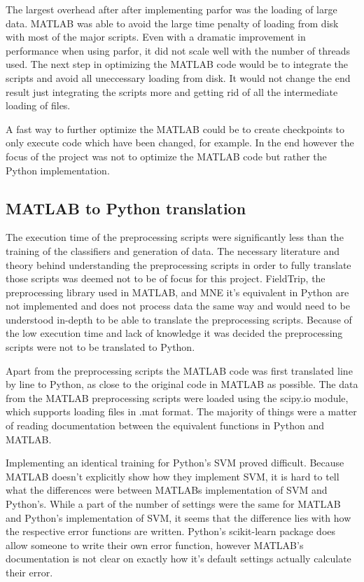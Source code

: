 \documentclass[12pt, a4paper]{article}
\begin{document}
The largest overhead after after implementing parfor was the loading of large data. 
MATLAB was able to avoid the large time penalty of loading from disk with most of the major scripts.
Even with a dramatic improvement in performance when using parfor, it did not scale well with the number of threads used.
The next step in optimizing the MATLAB code would be to integrate the scripts and avoid all uneccessary loading from disk.
It would not change the end result just integrating the scripts more and getting rid of all the intermediate loading of files.

A fast way to further optimize the MATLAB could be to create checkpoints to only execute code which have been changed, for example.
In the end however the focus of the project was not to optimize the MATLAB code but rather the Python implementation.


\subsection{MATLAB to Python translation}

The execution time of the preprocessing scripts were significantly less than the training of the classifiers and generation of data. 
The necessary literature and theory behind understanding the preprocessing scripts in order to fully translate those scripts was deemed not to be of focus for this project.
FieldTrip, the preprocessing library used in MATLAB, and MNE it's equivalent in Python are not implemented and does not process data the same way and would need to be understood in-depth to be able to translate the preprocessing scripts.
Because of the low execution time and lack of knowledge it was decided the preprocessing scripts were not to be translated to Python.

Apart from the preprocessing scripts the MATLAB code was first translated line by line to Python, as close to the original code in MATLAB as possible.
The data from the MATLAB preprocessing scripts were loaded using the scipy.io module, which supports loading files in .mat format.
The majority of things were a matter of reading documentation between the equivalent functions in Python and MATLAB.

Implementing an identical training for Python's SVM proved difficult.
Because MATLAB doesn't explicitly show how they implement SVM, it is hard to tell what the differences were between MATLABs implementation of SVM and Python's.
While a part of the number of settings were the same for MATLAB and Python's implementation of SVM, it seems that the difference lies with how the respective error functions are written.
Python's scikit-learn package does allow someone to write their own error function, however MATLAB's documentation is not clear on exactly how it's default settings actually calculate their error. %
\end{document}
